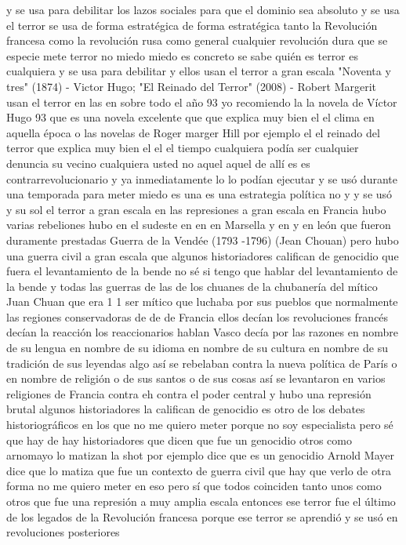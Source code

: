 y se usa para debilitar los lazos sociales para que el dominio sea absoluto y se usa
el terror se usa de forma estratégica de forma estratégica tanto la Revolución francesa como la revolución rusa
como general cualquier revolución dura que se especie mete terror no miedo miedo es concreto se sabe quién es
terror es cualquiera y se usa para debilitar y ellos usan el terror a gran escala
"Noventa y tres" (1874) - Victor Hugo; "El Reinado del Terror" (2008) - Robert Margerit
usan el terror en las en sobre todo el año 93 yo recomiendo la la novela de Víctor Hugo 93
que es una novela excelente que que explica muy bien el el clima en aquella época o las novelas de Roger marger Hill
por ejemplo el el reinado del terror que explica muy bien el el el tiempo cualquiera podía ser cualquier denuncia
su vecino cualquiera usted no aquel aquel de allí es es contrarrevolucionario y ya inmediatamente
lo lo podían ejecutar y se usó durante una temporada para meter miedo es una es una estrategia política no y y se usó
y su sol el terror a gran escala en las represiones a gran escala en Francia hubo varias rebeliones
hubo en el sudeste en en en Marsella y en y en león que fueron duramente prestadas
Guerra de la Vendée (1793 -1796) (Jean Chouan)
pero hubo una guerra civil a gran escala que algunos historiadores califican de genocidio que fuera el levantamiento de la bende
no sé si tengo que hablar del levantamiento de la bende y todas las guerras de las de los chuanes de la chubanería del mítico Juan Chuan
que era 1 1 ser mítico que luchaba por sus pueblos que normalmente las regiones conservadoras de
de de Francia ellos decían los revoluciones francés decían la reacción
los reaccionarios hablan Vasco decía por las razones en nombre de su lengua en nombre de su idioma
en nombre de su cultura en nombre de su tradición de sus leyendas algo así se rebelaban contra la nueva política de París
o en nombre de religión o de sus santos o de sus cosas así se levantaron en varios religiones de Francia
contra eh contra el poder central y hubo una represión brutal algunos historiadores la califican de genocidio
es otro de los debates historiográficos en los que no me quiero meter porque no soy especialista pero sé que hay de hay historiadores que dicen que fue un genocidio
otros como arnomayo lo matizan la shot por ejemplo dice que es un genocidio Arnold Mayer dice que lo matiza
que fue un contexto de guerra civil que hay que verlo de otra forma no me quiero meter en eso pero sí que todos coinciden tanto unos como otros
que fue una represión a muy amplia escala entonces ese terror
fue el último de los legados de la Revolución francesa porque ese terror se aprendió y se usó en revoluciones posteriores

